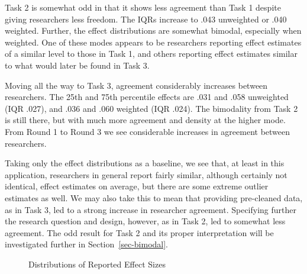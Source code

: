 \documentclass[
  letterpaper,
  DIV=11,
  numbers=noendperiod]{scrartcl}
\begin{document}
Task 2 is somewhat odd in that it shows less agreement than Task 1
despite giving researchers less freedom. The IQRs increase to .043
unweighted or .040 weighted. Further, the effect distributions are
somewhat bimodal, especially when weighted. One of these modes appears
to be researchers reporting effect estimates of a similar level to those
in Task 1, and others reporting effect estimates similar to what would
later be found in Task 3.

Moving all the way to Task 3, agreement considerably increases between
researchers. The 25th and 75th percentile effects are .031 and .058
unweighted (IQR .027), and .036 and .060 weighted (IQR .024). The
bimodality from Task 2 is still there, but with much more agreement and
density at the higher mode. From Round 1 to Round 3 we see considerable
increases in agreement between researchers.

Taking only the effect distributions as a baseline, we see that, at
least in this application, researchers in general report fairly similar,
although certainly not identical, effect estimates on average, but there
are some extreme outlier estimates as well. We may also take this to
mean that providing pre-cleaned data, as in Task 3, led to a strong
increase in researcher agreement. Specifying further the research
question and design, however, as in Task 2, led to somewhat less
agreement. The odd result for Task 2 and its proper interpretation will
be investigated further in Section~\ref{sec-bimodal}.

\begin{figure}


\caption{\label{fig-effect-distributions}Distributions of Reported
Effect Sizes}

\end{figure}%
\end{document}
